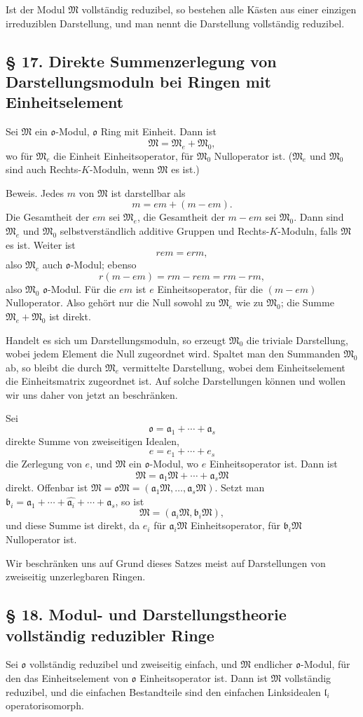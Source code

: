 \documentclass[11pt]{article}
\providecommand{\mM}{\mathfrak{M}}
\providecommand{\mo}{\mathfrak{o}}
\providecommand{\ma}{\mathfrak{a}}
\providecommand{\mb}{\mathfrak{b}}
\providecommand{\ml}{\mathfrak{l}}
\begin{document}
Ist der Modul $\mM$ vollständig reduzibel, so bestehen alle Kästen aus einer einzigen irreduziblen Darstellung, und man nennt die Darstellung vollständig reduzibel.

\subsection*{§ 17. Direkte Summenzerlegung von Darstellungsmoduln bei Ringen mit Einheitselement}
Sei $\mM$ ein $\mo$-Modul, $\mo$ Ring mit Einheit. Dann ist
\[
        \mM=\mM_e+\mM_0,
\]
wo für $\mM_e$ die Einheit Einheitsoperator, für $\mM_0$ Nulloperator ist. ($\mM_e$ und $\mM_0$ sind auch Rechts-$K$-Moduln, wenn $\mM$ es ist.)

Beweis. Jedes $m$ von $\mM$ ist darstellbar als
\[
        m=em+(m-em).
\]
Die Gesamtheit der $em$ sei $\mM_e$, die Gesamtheit der $m-em$ sei $\mM_0$. Dann sind $\mM_e$ und $\mM_0$ selbstverständlich additive Gruppen und Rechts-$K$-Moduln, falls $\mM$ es ist. Weiter ist
\[
        r em=erm,
\]
also $\mM_e$ auch $\mo$-Modul; ebenso
\[
        r(m-em)=rm-rem=rm-rm,
\]
also $\mM_0$ $\mo$-Modul. Für die $em$ ist $e$ Einheitsoperator, für die $(m-em)$ Nulloperator. Also gehört nur die Null sowohl zu $\mM_e$ wie zu $\mM_0$; die Summe $\mM_e+\mM_0$ ist direkt.

Handelt es sich um Darstellungsmoduln, so erzeugt $\mM_0$ die triviale Darstellung, wobei jedem Element die Null zugeordnet wird. Spaltet man den Summanden $\mM_0$ ab, so bleibt die durch $\mM_e$ vermittelte Darstellung, wobei dem Einheitselement die Einheitsmatrix zugeordnet ist. Auf solche Darstellungen können und wollen wir uns daher von jetzt an beschränken.

Sei
\[
        \mo=\ma_1+\cdots+\ma_s
\]
direkte Summe von zweiseitigen Idealen,
\[
        e=e_1+\cdots+e_s
\]
die Zerlegung von $e$, und $\mM$ ein $\mo$-Modul, wo $e$ Einheitsoperator ist. Dann ist
\[
        \mM=\ma_1\mM+\cdots+\ma_s\mM
\]
direkt. Offenbar ist $\mM=\mo\mM=(\ma_1\mM,\ldots,\ma_s\mM)$. Setzt man $\mb_i=\ma_1+\cdots+\widehat{\ma_i}+\cdots+\ma_s$, so ist
\[
        \mM=(\ma_i\mM,\mb_i\mM),
\]
und diese Summe ist direkt, da $e_i$ für $\ma_i\mM$ Einheitsoperator, für $\mb_i\mM$ Nulloperator ist.

Wir beschränken uns auf Grund dieses Satzes meist auf Darstellungen von zweiseitig unzerlegbaren Ringen.

\subsection*{§ 18. Modul- und Darstellungstheorie vollständig reduzibler Ringe}
Sei $\mo$ vollständig reduzibel und zweiseitig einfach, und $\mM$ endlicher $\mo$-Modul, für den das Einheitselement von $\mo$ Einheitsoperator ist. Dann ist $\mM$ vollständig reduzibel, und die einfachen Bestandteile sind den einfachen Linksidealen $\ml_i$ operatorisomorph.
\end{document}
